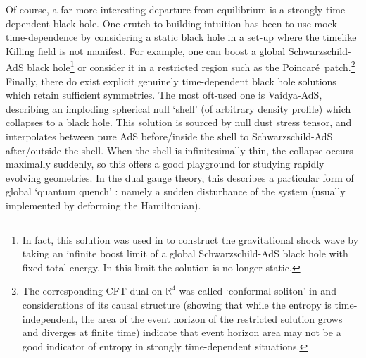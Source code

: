 \documentclass[12pt,a4paper]{article}
\def\GT{gauge theory}
\def\Poinc{Poincar\' e}
\def\schw{Schwarzschild}
\def\RR{\mathbb{R}}
\begin{document}
Of course, a far more interesting departure from equilibrium is a strongly time-dependent black hole.  One crutch to building intuition has been to use mock time-dependence by considering a static black hole in a set-up where the timelike Killing field is not manifest.  For example, one can boost a global \schw-AdS black hole\footnote{
In fact, this solution was used in \cite{Horowitz:1999gf} to construct the gravitational shock wave by taking an infinite boost limit of a global \schw-AdS black hole with fixed total energy.  In this limit the solution is no longer static.
}
 or consider it in a restricted region such as the \Poinc\ patch.\footnote{
The corresponding CFT dual on $\RR^4$ was called `conformal soliton' in \cite{Friess:2006kw}
and considerations of its causal structure \cite{Figueras:2009iu} 
(showing that while the entropy is time-independent, the area of the event horizon of the restricted solution grows and diverges at finite time) indicate that event horizon area may not be a good indicator of entropy in strongly time-dependent situations.
}
Finally, there do exist explicit genuinely time-dependent black hole solutions which retain sufficient symmetries.  The most oft-used one is Vaidya-AdS, describing an imploding spherical null `shell' (of arbitrary density profile) which collapses to a black hole.  This solution is sourced by null dust stress tensor, and interpolates between pure AdS before/inside the shell to \schw-AdS after/outside the shell.  
When the shell is infinitesimally thin, the collapse occurs maximally suddenly, so this offers a good playground for studying rapidly evolving geometries.  In the dual \GT, this describes a particular form of global `quantum quench' \cite{Calabrese07}: namely a sudden disturbance of the system (usually implemented by deforming the Hamiltonian).
\end{document}
